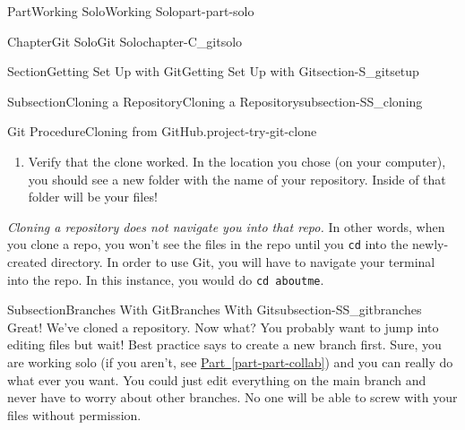 \documentclass[oneside,10pt,]{book}
\newcommand{\xreffont}{\relax}
\newcommand{\mono}[1]{\texttt{#1}}
\newcommand{\acronym}[1]{\textsc{\MakeLowercase{#1}}}
\newcommand{\consoleinput}[1]{\textbf{#1}}
\newcommand{\kbd}[1]{\keys{{#1}}}
\begin{document}
\begin{partptx}{Part}{Working Solo}{}{Working Solo}{}{}{part-part-solo}
\begin{chapterptx}{Chapter}{Git Solo}{}{Git Solo}{}{}{chapter-C_gitsolo}
\begin{sectionptx}{Section}{Getting Set Up with Git}{}{Getting Set Up with Git}{}{}{section-S_gitsetup}
\begin{subsectionptx}{Subsection}{Cloning a Repository}{}{Cloning a Repository}{}{}{subsection-SS_cloning}
\begin{project}{Git Procedure}{Cloning from GitHub.}{project-try-git-clone}
\begin{enumerate}[font=\bfseries,label=(\alph*),ref=\alph*]
\begin{console}{0}{1}{0}
> (*\consoleinput{git clone <copied-https-string>}*)
Cloning into 'aboutme'...
remote: Enumerating objects: 17, done.
remote: Counting objects: 100%
remote: Compressing objects: 100%
remote: Total 17 (delta 2), reused 0 (delta 0), pack-reused 3
Receiving objects: 100%
Resolving deltas: 100%
\end{console}
where \textless{}copied-https-string\textgreater{} is replaced with the HTTPS string you copied in \hyperref[task-clone-https]{Task~{\xreffont\ref{project-try-git-clone}}.{\xreffont\ref{task-clone-https}}}. Press \kbd{Enter} to run the command.%
\par
Your terminal may ask you for your GitHub username and password. This is ok: enter your username and instead of typing your normal GitHub password, paste\slash{}type your \acronym{PAT} as found in \hyperref[project-gitproc-pat]{Git Procedure~{\xreffont\ref{project-gitproc-pat}}}.%
\item{}Verify that the clone worked. In the location you chose (on your computer), you should see a new folder with the name of your repository. Inside of that folder will be your files!%
\end{enumerate}%
\end{project}%
\emph{Cloning a repository does not navigate you into that repo.} In other words, when you clone a repo, you won't see the files in the repo until you \mono{cd} into the newly-created directory. In order to use Git, you will have to navigate your terminal into the repo. In this instance, you would do \mono{cd aboutme}.%
\end{subsectionptx}
%
%
\typeout{************************************************}
\typeout{************************************************}
%
\begin{subsectionptx}{Subsection}{Branches With Git}{}{Branches With Git}{}{}{subsection-SS_gitbranches}
%
%
Great! We've cloned a repository. Now what? You probably want to jump into editing files but wait! Best practice says to create a new branch first. Sure, you are working solo (if you aren't, see \hyperref[part-part-collab]{Part~{\xreffont\ref{part-part-collab}}}) and you can really do what ever you want. You could just edit everything on the main branch and never have to worry about other branches. No one will be able to screw with your files without permission.%

\end{subsectionptx}
\end{sectionptx}
\end{chapterptx}
\end{partptx}
\end{document}

